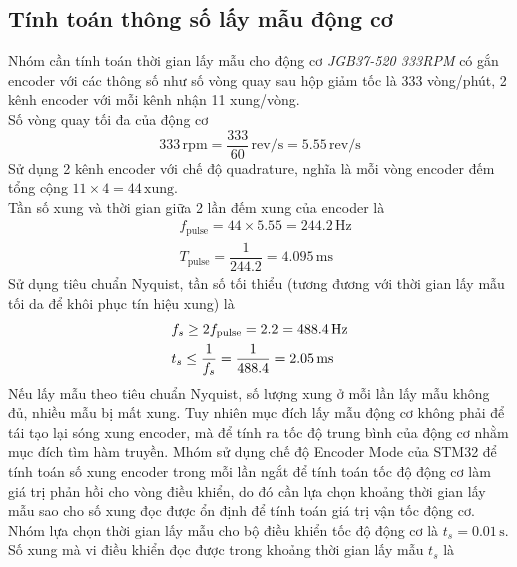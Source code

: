           \subsection{Tính toán thông số lấy mẫu động cơ}
               \hspace*{0.6cm}Nhóm cần tính toán thời gian lấy mẫu cho động cơ \textit{JGB37-520 333RPM} có gắn encoder với các thông số như số vòng quay sau 
               hộp giảm tốc là 333 vòng/phút, 2 kênh encoder với mỗi kênh nhận 11 xung/vòng.\\
               Số vòng quay tối đa của động cơ
               \begin{equation*}
                    333 \,\mathrm{rpm} = \dfrac{333}{60} \,\mathrm{rev/s} = 5.55 \,\mathrm{rev/s}
               \end{equation*}
               Sử dụng 2 kênh encoder với chế độ quadrature, nghĩa là mỗi vòng encoder đếm tổng cộng $11 \times 4 = 44 \,\mathrm{xung}$.\\
               Tần số xung và thời gian giữa 2 lần đếm xung của encoder là 
               \begin{align*}
                    &f_{\text{pulse}} = 44 \times 5.55 = 244.2 \,\mathrm{Hz}\\
                    &T_{\text{pulse}} = \dfrac{1}{244.2} = 4.095 \,\mathrm{ms}
               \end{align*}
               Sử dụng tiêu chuẩn Nyquist, tần số tối thiểu (tương đương với thời gian lấy mẫu tối da để khôi phục tín hiệu xung) là 
               \begin{align*}
                    &f_s \geq 2 f_{\text{pulse}} = 2 \time 244.2 = 488.4 \,\mathrm{Hz}\\
                    &t_s \leq \dfrac{1}{f_s} = \dfrac{1}{488.4} = 2.05 \,\mathrm{ms}
               \end{align*}
               Nếu lấy mẫu theo tiêu chuẩn Nyquist, số lượng xung ở mỗi lần lấy mẫu không đủ, nhiều mẫu bị mất xung. Tuy nhiên mục đích lấy mẫu động cơ không phải để tái tạo lại sóng xung encoder, mà để tính ra tốc độ trung bình của động cơ nhằm mục đích tìm hàm truyền. Mhóm sử dụng chế độ Encoder Mode của STM32 để tính toán
               số xung encoder trong mỗi lần ngắt để tính toán tốc độ động cơ làm giá trị phản hồi cho vòng điều khiển, do đó cần lựa chọn khoảng thời gian lấy mẫu sao cho số xung đọc được 
               ổn định để tính toán giá trị vận tốc động cơ. Nhóm lựa chọn thời gian lấy mẫu cho bộ điều khiển tốc độ động cơ là $t_s = 0.01 \,\mathrm{s}$. Số xung mà vi điều khiển đọc được trong khoảng thời gian lấy mẫu $t_s$ là 
